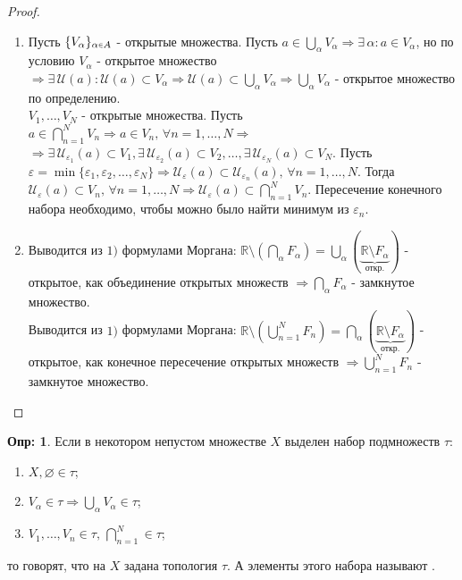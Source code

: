 \documentclass[12pt]{article}
\theoremstyle{definition}
\newtheorem{defn}{Опр:}
\newcommand{\smallerrel}[1]{\mathrel{\mathpalette\smallerrelaux{#1}}}
\newcommand{\smallerrelaux}[2]{\raisebox{.1ex}{\scalebox{.75}{$#1#2$}}}
\newcommand{\smallin}{\smallerrel{\in}}
\begin{document}
\begin{proof}\hfill
	\begin{enumerate}[label={\arabic*)}]
		\item Пусть $\{V_\alpha\}_{\alpha \smallin A}$ - открытые множества. Пусть $a \in \bigcup\limits_\alpha V_\alpha \Rightarrow \exists \, \alpha \colon a \in V_\alpha$, но по условию $V_\alpha$ - открытое множество $\Rightarrow \exists \, \mathcal{U}(a) \colon \mathcal{U}(a) \subset V_\alpha \Rightarrow \mathcal{U}(a) \subset \bigcup\limits_\alpha V_\alpha \Rightarrow \bigcup\limits_\alpha V_\alpha$ - открытое множество по определению.\\
		$V_1,\dotsc, V_N$ - открытые множества. Пусть $a \in \bigcap\limits_{n=1}^{N} V_n \Rightarrow a \in V_n, \, \forall n = 1, \dotsc, N \Rightarrow$\\ $\Rightarrow \exists \, \mathcal{U}_{\varepsilon_1}(a) \subset V_1, \exists \, \mathcal{U}_{\varepsilon_2}(a) \subset V_2, \dotsc, \exists \, \mathcal{U}_{\varepsilon_N}(a) \subset V_N$. Пусть $\varepsilon = \min\{\varepsilon_1, \varepsilon_2, \dotsc, \varepsilon_N \} \Rightarrow \mathcal{U}_\varepsilon(a) \subset \mathcal{U}_{\varepsilon_n}(a), \, \forall n = 1, \dotsc, N$. Тогда $\mathcal{U}_\varepsilon(a) \subset V_n, \, \forall n = 1, \dotsc, N \Rightarrow \mathcal{U}_\varepsilon(a) \subset \bigcap\limits_{n=1}^{N} V_n$. Пересечение конечного набора необходимо, чтобы можно было найти минимум из $\varepsilon_n$.
		
		\item Выводится из $1)$ формулами Моргана: $\mathbb{R} \setminus(\bigcap\limits_\alpha F_\alpha) = \bigcup\limits_\alpha(\underbrace{\mathbb{R} \setminus F_\alpha}_{\text{откр.}})$ - открытое, как объединение открытых множеств $\Rightarrow \bigcap\limits_\alpha F_\alpha$ - замкнутое множество.\\		
		Выводится из $1)$ формулами Моргана: $\mathbb{R} \setminus (\bigcup\limits_{n=1}^{N} F_n) = \bigcap\limits_\alpha(\underbrace{\mathbb{R} \setminus F_\alpha}_{\text{откр.}})$ - открытое, как конечное пересечение открытых множеств $\Rightarrow \bigcup\limits_{n=1}^{N} F_n$ - замкнутое множество.
	\end{enumerate}
\end{proof}

\begin{defn}
	Если в некотором непустом множестве $X$ выделен набор подмножеств $\tau$:
	\begin{enumerate}[label={(\arabic*)}]
		\item $X, \varnothing \in \tau$;\\
		\item $V_\alpha \in \tau \Rightarrow \bigcup\limits_{\alpha} V_\alpha \in \tau$;
		\item $V_1, \dotsc, V_n \in \tau, \, \bigcap\limits_{n=1}^{N} \in \tau$;
	\end{enumerate}
	то говорят, что на $X$ задана топология $\tau$. А элементы этого набора называют .
\end{defn}
\end{document}
